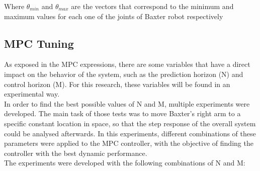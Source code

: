 \documentclass[11pt]{report} %
\begin{document}
Where $\theta_{min}$ and $\theta_{max}$ are the vectors that correspond to the minimum and maximum values for each one of the joints of Baxter robot respectively

\subsection{MPC Tuning}

As exposed in the MPC expressions, there are some variables that have a direct impact on the behavior of the system, such as the prediction horizon (N) and control horizon (M). For this research, these variables will be found in an experimental way.\\

In order to find the best possible values of N and M, multiple experiments were developed. The main task of those tests was to move Baxter's right arm to a specific constant location in space, so that the step response of the overall system could be analysed afterwards. In this experiments, different combinations of these parameters were applied to the MPC controller, with the objective of finding the controller with the best dynamic performance.\\

The experiments were developed with the following combinations of N and M:

\begin{table}[H]
\begin{center}
\caption{\label{tab:combination_n_m} Combinations of N and M for MPC tests.}
\end{center}
\end{table}
\end{document}
